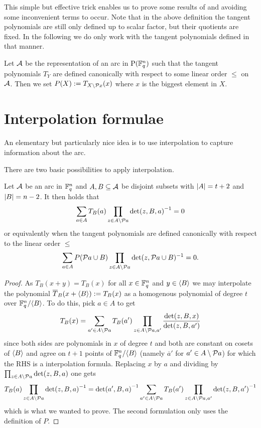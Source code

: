 \begin{remark}
    This simple but effective trick enables us to prove some results of  and  avoiding some inconvenient terms to occur.
    Note that in the above definition the tangent polynomials are still only defined up to scalar factor, but their quotients are fixed.
    In the following we do only work with the tangent polynomials defined in that manner.
\end{remark}

\begin{definition}\label{tang-pol-eval}
    Let $\mathcal{A}$ be the representation of an arc in $\P(\field{q}^n)$ such that the tangent polynomials $T_Y$ are defined canonically with respect to some linear order $\leq$ on $\mathcal{A}$. Then we set $P(X):=T_{X\setminus\set{x}}(x)$ where $x$ is the biggest element in  $X$.
\end{definition}

\section{Interpolation formulae}

An elementary but particularly nice idea is to use interpolation to capture information about the arc.

There are two basic possibilities to apply interpolation. 

\begin{lemma}
    Let $\mathcal{A}$ be an arc in $\mathbb{F}_{q}^n$ and $A,B\subseteq \mathcal{A}$ be disjoint subsets with
    $\left|A\right|=t+2$ and $\left|B\right|=n-2$. It then holds that
    $$
    \sum_{a\in A}{T_{B}(a)\prod_{z\in A\setminus \set a}{\det(z,B,a)}^{-1}} =0
    $$
    or equivalently when the tangent polynomials are defined canonically
    with respect to the linear order $\leq$
    $$
    \sum_{a\in A}{P(\set a\setjoin B)\prod_{z\in A\setminus\set a}\det(z,\set a\setjoin B)^{-1}}=0.
    $$
\end{lemma}
%
\begin{proof}
    As $T_B(x+y)=T_B(x)$ for all $x\in\mathbb{F}_{q}^n$ and $y\in\gen B$ we may
    interpolate the polynomial $\bar{T}_B(x+\gen B):=T_{B}(x)$ as a homogenous polynomial of
    degree $t$ over $\field{q}^n/\gen B$. To do this, pick $a\in A$ to get
    $$
    T_B(x)=\sum_{a'\in A\setminus\set a}{T_B(a')\prod_{z\in A\setminus\set{a,a'}}{\frac{\det(z,B,x)}{\det(z,B,a')}}}
    $$
    since both sides are polynomials in $x$ of degree $t$
    and both are constant on cosets of $\gen B$ and agree on $t+1$
    points of $\field{q}^n/\gen B$ (namely $\overline{a}'$
    for $a'\in A\setminus\set a$) for which the RHS is a  interpolation formula. Replacing $x$ by $a$ and dividing by
  $\prod_{z\in A\setminus\set a}{\det(z,B,a)}$ one gets 
  $$
  T_B(a)\prod_{z\in  A\setminus\set a}{{\det(z,B,a)}^{-1}} = {\det(a',B,a)}^{-1}\sum_{a'\in A\setminus\set a}{T_B(a')\prod_{z\in A\setminus\set{a,a'}}{{\det(z,B,a')}^{-1}}}
  $$
  which is what we wanted to prove.
  The second formulation only uses the definition of $P$.
\end{proof}

